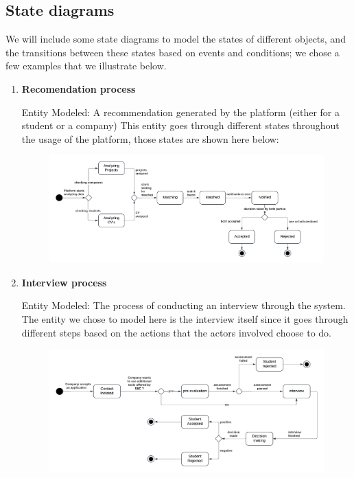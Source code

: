 \subsection{State diagrams}
We will include some state diagrams to model the states of different objects, and the transitions between these states based on events and conditions; we chose a few examples that we illustrate below.
\begin{enumerate}

\item \textbf{Recomendation process}

Entity Modeled: A recommendation generated by the platform (either for a student or a company)
This entity goes through different states throughout the usage of the platform, those states are shown here below:


\begin{figure}[H]
    \centering
    \includegraphics[width=1\linewidth]{RASD//Images/recomendation.png}
    \caption{}
    \label{fig:enter-label}
\end{figure}


\item \textbf{Interview process}

Entity Modeled: The process of conducting an interview through the system.
The entity we chose to model here is the interview itself since it goes through different steps based on the actions that the actors involved choose to do.

\begin{figure}[H]
    \centering
    \includegraphics[width=1\linewidth]{RASD//Images/interview.png}
    \caption{}
    \label{fig:enter-label}
\end{figure}



\end{enumerate}
